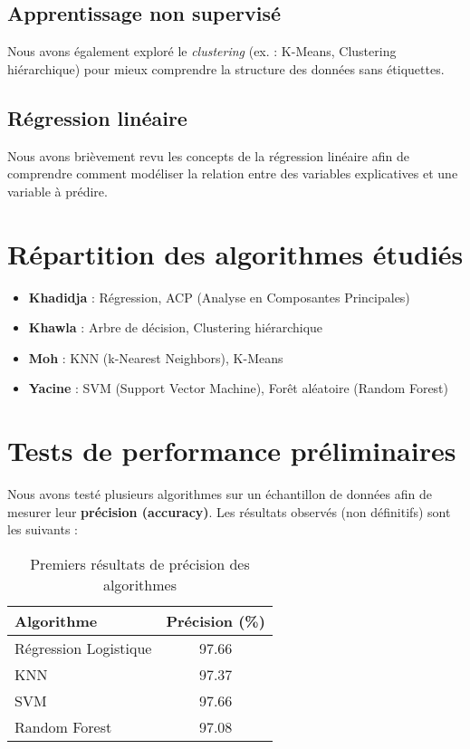 \documentclass[12pt,a4paper]{report}
\begin{document}
\section{Apprentissage non supervisé}
Nous avons également exploré le \textit{clustering} (ex. : K-Means, Clustering hiérarchique) pour 
mieux comprendre la structure des données sans étiquettes.

\section{Régression linéaire}
Nous avons brièvement revu les concepts de la régression linéaire afin de comprendre comment modéliser 
la relation entre des variables explicatives et une variable à prédire.

\chapter{Répartition des algorithmes étudiés}
\begin{itemize}
    \item \textbf{Khadidja} : Régression, ACP (Analyse en Composantes Principales)
    \item \textbf{Khawla} : Arbre de décision, Clustering hiérarchique
    \item \textbf{Moh} : KNN (k-Nearest Neighbors), K-Means
    \item \textbf{Yacine} : SVM (Support Vector Machine), Forêt aléatoire (Random Forest)
\end{itemize}

\chapter{Tests de performance préliminaires}
Nous avons testé plusieurs algorithmes sur un échantillon de données afin de mesurer leur 
\textbf{précision (accuracy)}. Les résultats observés (non définitifs) sont les suivants :

\begin{table}[h!]
\centering
\begin{tabular}{l c}
\toprule
\textbf{Algorithme} & \textbf{Précision (\%)} \\
\midrule
Régression Logistique & 97.66 \\
KNN                  & 97.37 \\
SVM                  & 97.66 \\
Random Forest        & 97.08 \\
\bottomrule
\end{tabular}
\caption{Premiers résultats de précision des algorithmes}
\label{tab:results}
\end{table}
\end{document}
